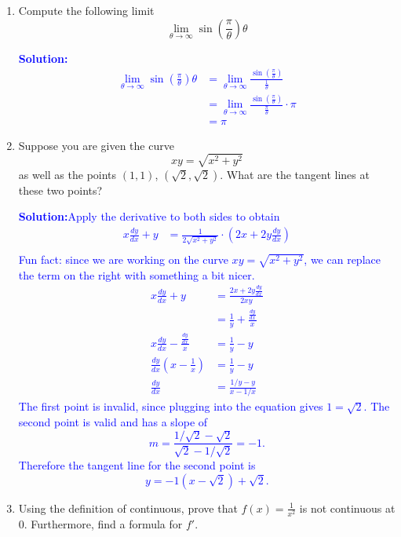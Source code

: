 \documentclass[letterpaper,11pt]{article}
\newcommand{\sol}[2]{\begin{minipage}[c][#1]{\linewidth}{\textcolor{blue}{\textbf{Solution:}}\quad \textcolor{blue}{#2}}\end{minipage}}
\newcommand{\sol}[2]{\begin{minipage}[c][#1]{\linewidth}{\vfill}\end{minipage}}
\begin{document}
\begin{enumerate}
    \item Compute the following limit
    \[\lim_{\theta \to \infty} \sin\left(\frac{\pi}{\theta}\right)\theta\]
    \sol{}{\begin{align*}
        \lim_{\theta \to \infty} \sin\left(\frac{\pi}{\theta}\right)\theta & = \lim_{\theta \to \infty} \frac{\sin\left(\frac{\pi}{\theta}\right)}{\frac{1}{\theta}} \\
        & =  \lim_{\theta \to \infty} \frac{\sin\left(\frac{\pi}{\theta}\right)}{\frac{\pi}{\theta}} \cdot \pi \\
        & = \pi
    \end{align*}}
    
    \newpage
    \item Suppose you are given the curve 
    \[xy = \sqrt{x^2+y^2}\]
    as well as the points $(1,1)$, $(\sqrt{2},\sqrt{2})$. What are the tangent lines at these two points?
    \sol{}{Apply the derivative to both sides to obtain
    \begin{align*}
        x\frac{dy}{dx} + y & = \frac{1}{2\sqrt{x^2 + y^2}} \cdot (2x + 2y \frac{dy}{dx}) \\
    \end{align*}
    Fun fact: since we are working on the curve $xy = \sqrt{x^2+y^2}$, we can replace the term on the right with something a bit nicer.
    \begin{align*}
         x\frac{dy}{dx} + y & = \frac{2x + 2y \frac{dy}{dx}}{2xy} \\
         & = \frac{1}{y} + \frac{\frac{dy}{dx}}{x}\\
         x \frac{dy}{dx} - \frac{\frac{dy}{dx}}{x} & = \frac{1}{y} - y\\
         \frac{dy}{dx}\left(x - \frac{1}{x}\right) & = \frac{1}{y} - y\\
         \frac{dy}{dx} & = \frac{1/y - y}{x - 1/x}
    \end{align*}
    The first point is invalid, since plugging into the equation gives $1 = \sqrt{2}$. The second point is valid and has a slope of
    \[m = \frac{1/\sqrt{2} - \sqrt{2}}{\sqrt{2}-1/\sqrt{2}} = -1.\]
    Therefore the tangent line for the second point is 
    \[y = -1(x-\sqrt{2}) + \sqrt{2}.\]
    }
    
    \newpage
    \item Using the definition of continuous, prove that $f(x) = \frac{1}{x^2}$ is not continuous at 0. Furthermore, find a formula for $f'$.
    

\end{enumerate}
\end{document}
